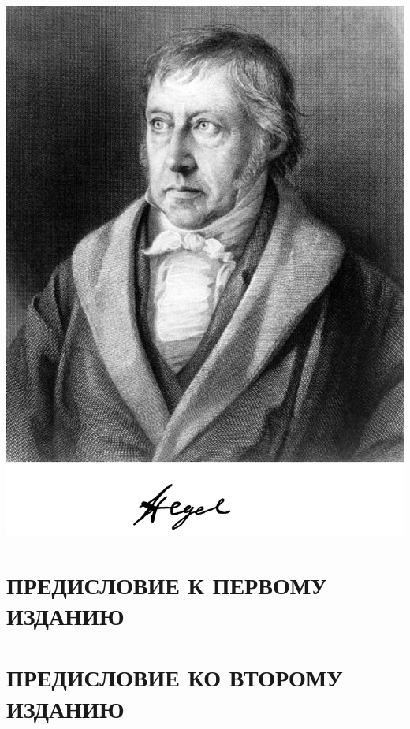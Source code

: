 \documentclass[b5paper, 11pt, twoside, onecolumn, openany]{memoir}
\begin{document}
\begin{center}
\includegraphics[width=14cm]{hegel-img001.png}
\end{center}

\restoregeometry

\mainmatter

\pagestyle{plain}

\section[Предисловие к первому изданию]{\large ПРЕДИСЛОВИЕ К ПЕРВОМУ ИЗДАНИЮ}
\thispagestyle{empty}


\clearpage

\section[Предисловие ко второму изданию]{\large ПРЕДИСЛОВИЕ КО ВТОРОМУ ИЗДАНИЮ}
\thispagestyle{empty}

\end{document}
